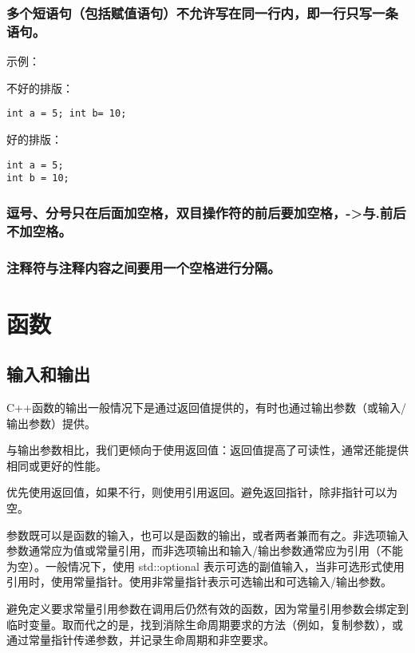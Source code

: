 \subsection{多个短语句（包括赋值语句）不允许写在同一行内，即一行只写一条语句。}
示例：

不好的排版：
\begin{verbatim}
int a = 5; int b= 10;
\end{verbatim}

好的排版：
\begin{verbatim}
int a = 5;
int b = 10;
\end{verbatim}


\subsection{逗号、分号只在后面加空格，双目操作符的前后要加空格，->与.前后不加空格。}


\subsection{注释符与注释内容之间要用一个空格进行分隔。}


\chapter{函数}


\section{输入和输出}
C++函数的输出一般情况下是通过返回值提供的，有时也通过输出参数（或输入/输出参数）提供。

与输出参数相比，我们更倾向于使用返回值：返回值提高了可读性，通常还能提供相同或更好的性能。

优先使用返回值，如果不行，则使用引用返回。避免返回指针，除非指针可以为空。

参数既可以是函数的输入，也可以是函数的输出，或者两者兼而有之。非选项输入参数通常应为值或常量引用，而非选项输出和输入/输出参数通常应为引用（不能为空）。一般情况下，使用 std::optional 表示可选的副值输入，当非可选形式使用引用时，使用常量指针。使用非常量指针表示可选输出和可选输入/输出参数。

避免定义要求常量引用参数在调用后仍然有效的函数，因为常量引用参数会绑定到临时变量。取而代之的是，找到消除生命周期要求的方法（例如，复制参数），或通过常量指针传递参数，并记录生命周期和非空要求。

